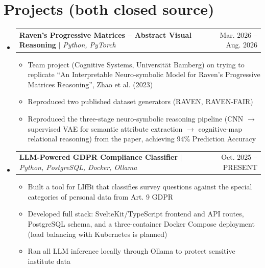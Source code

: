 \documentclass[letterpaper,11pt]{article}
\makeatletter
\newif\ifgerman
\newcommand{\bi}[2]{\ifgerman#2\else#1\fi}
\newcommand{\resumeItem}[1]{
  \item\small{
    {#1 \vspace{-2pt}}
  }
}
\newcommand{\resumeProjectHeading}[2]{
    \item
    \begin{tabular*}{0.97\textwidth}{l@{\extracolsep{\fill}}r}
      \small#1 & #2 \\
    \end{tabular*}\vspace{-7pt}
}
\newcommand{\resumeSubHeadingListStart}{\begin{itemize}[leftmargin=0.15in, label={}]}
\newcommand{\resumeSubHeadingListEnd}{\end{itemize}}
\newcommand{\resumeItemListStart}{\begin{itemize}}
\newcommand{\resumeItemListEnd}{\end{itemize}\vspace{-5pt}}
\makeatother
\begin{document}
\section{\bi{Projects (both closed source)}{Projekte (beide Closed Source)}}
    \resumeSubHeadingListStart
      \resumeProjectHeading
          {\textbf{\bi{Raven's Progressive Matrices -- Abstract Visual Reasoning}{Raven's Progressive Matrices -- abstraktes visuelles Schließen}} $|$ \emph{Python, PyTorch}}{\bi{Mar. 2026 -- Aug. 2026}{März 2026 -- Aug. 2026}}
          \resumeItemListStart
            \resumeItem{\bi
              {Team project (Cognitive Systems, Universität Bamberg) on trying to replicate ``An Interpretable Neuro-symbolic Model for Raven's Progressive Matrices Reasoning'', Zhao et al. (2023)}
              {Teamprojekt (Kognitive Systeme, Universität Bamberg) zur Replikation von „An Interpretable Neuro-symbolic Model for Raven's Progressive Matrices Reasoning“, Zhao et al. (2023)}}
            \resumeItem{\bi
              {Reproduced two published dataset generators (RAVEN, RAVEN-FAIR)}
              {Nachbildung zweier veröffentlichter Datensatzgeneratoren (RAVEN, RAVEN-FAIR)}}
            \resumeItem{\bi
              {Reproduced the three-stage neuro-symbolic reasoning pipeline (CNN $\rightarrow$ supervised VAE for semantic attribute extraction $\rightarrow$ cognitive-map relational reasoning) from the paper, achieving 94\% Prediction Accuracy}
              {Reproduktion der dreistufigen neuro-symbolischen Reasoning-Pipeline aus dem Paper (CNN $\rightarrow$ überwachter VAE zur semantischen Attributextraktion $\rightarrow$ relationales Schlussfolgern auf einer Cognitive Map) mit 94\% Vorhersagegenauigkeit}}
          \resumeItemListEnd
      \resumeProjectHeading
          {\textbf{\bi{LLM-Powered GDPR Compliance Classifier}{LLM-basierter DSGVO-Compliance-Klassifikator}} $|$ \emph{Python, PostgreSQL, Docker, Ollama}}{\bi{Oct. 2025 -- PRESENT}{Okt. 2025 -- HEUTE}}
          \resumeItemListStart
            \resumeItem{\bi
              {Built a tool for LIfBi that classifies survey questions against the special categories of personal data from Art. 9 GDPR}
              {Entwicklung eines Tools für das LIfBi, das Befragungsfragen anhand der besonderen Kategorien personenbezogener Daten nach Art. 9 DSGVO klassifiziert}}
            \resumeItem{\bi
              {Developed full stack: SvelteKit/TypeScript frontend and API routes, PostgreSQL schema, and a three-container Docker Compose deployment (load balancing with Kubernetes is planned)}
              {Umsetzung des gesamten Stacks: SvelteKit/TypeScript-Frontend und API-Routen, PostgreSQL-Schema sowie ein Deployment aus drei Containern mit Docker Compose (Load balancing mit Kubernetes ist geplant)}}
            \resumeItem{\bi
              {Ran all LLM inference locally through Ollama to protect sensitive institute data}
              {Lokale LLM-Inferenz über Ollama zum Schutz sensibler Institutsdaten}}
          \resumeItemListEnd
    \resumeSubHeadingListEnd
\end{document}

